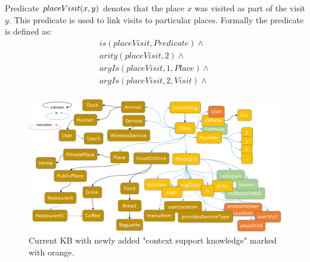 \begin{definition}\label{pred:placeVisit}
Predicate $\\placeVisit(x,y)$ denotes that the place $x$ was visited as part of
the visit $y$. This predicate is used to link visits to particular places.
Formally the predicate is defined as:
\begin{equation}\label{as:placeVisit}
\begin{gathered}
    is(placeVisit,Predicate) \land \\
	arity(placeVisit,2) \land \\
	argIs(placeVisit,1,Place) \land\\
	argIs(placeVisit,2, Visit) \land \\
\end{gathered}
\end{equation}
\end{definition}

\begin{figure}[h]
	\centering
		\includegraphics[width=1\textwidth]{figures/contextOntology.png}
	\caption{Current KB with newly added "context support knowledge" marked 
with orange.}
	\label{fig:contextKB}
\end{figure}

